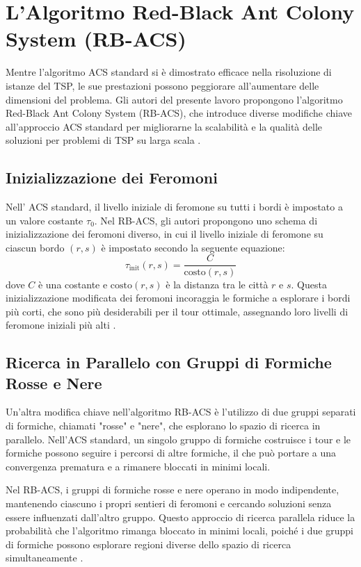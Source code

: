 \section{L'Algoritmo Red-Black Ant Colony System (\gls{RB-ACS})}
Mentre l'algoritmo  \gls{ACS} standard si è dimostrato efficace nella risoluzione di istanze del \gls{TSP}, le sue prestazioni possono peggiorare all'aumentare delle dimensioni del problema. Gli autori del presente lavoro propongono l'algoritmo Red-Black Ant Colony System (\gls{RB-ACS}), che introduce diverse modifiche chiave all'approccio  \gls{ACS} standard per migliorarne la scalabilità e la qualità delle soluzioni per problemi di \gls{TSP} su larga scala \cite{Hassan2013}.

\subsection{Inizializzazione dei Feromoni}
Nell' \gls{ACS} standard, il livello iniziale di feromone su tutti i bordi è impostato a un valore costante $\tau_0$. Nel \gls{RB-ACS}, gli autori propongono uno schema di inizializzazione dei feromoni diverso, in cui il livello iniziale di feromone su ciascun bordo $(r,s)$ è impostato secondo la seguente equazione:
\begin{equation}
	\tau_\text{init}(r,s) = \frac{C}{\text{costo}(r,s)}
\end{equation}
dove $C$ è una costante e $\text{costo}(r,s)$ è la distanza tra le città $r$ e $s$. Questa inizializzazione modificata dei feromoni incoraggia le formiche a esplorare i bordi più corti, che sono più desiderabili per il tour ottimale, assegnando loro livelli di feromone iniziali più alti \cite{Hassan2013}.

\subsection{Ricerca in Parallelo con Gruppi di Formiche Rosse e Nere}
Un'altra modifica chiave nell'algoritmo \gls{RB-ACS} è l'utilizzo di due gruppi separati di formiche, chiamati "rosse" e "nere", che esplorano lo spazio di ricerca in parallelo. Nell'\gls{ACS} standard, un singolo gruppo di formiche costruisce i tour e le formiche possono seguire i percorsi di altre formiche, il che può portare a una convergenza prematura e a rimanere bloccati in minimi locali.

Nel \gls{RB-ACS}, i gruppi di formiche rosse e nere operano in modo indipendente, mantenendo ciascuno i propri sentieri di feromoni e cercando soluzioni senza essere influenzati dall'altro gruppo. Questo approccio di ricerca parallela riduce la probabilità che l'algoritmo rimanga bloccato in minimi locali, poiché i due gruppi di formiche possono esplorare regioni diverse dello spazio di ricerca simultaneamente \cite{Hassan2013}.


